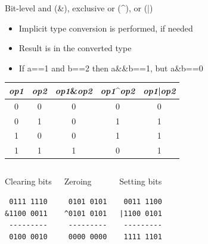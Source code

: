 \documentclass[usenames,dvipsnames,aspectratio=169]{beamer}
\begin{document}
\begin{frame}[fragile]{Bit-level and (\&), exclusive or (\textasciicircum), or (|)}
  \begin{itemize}
    \item Implicit type conversion is performed, if needed
    \item Result is in the converted type
    \item {} If a==1 and b==2 then a\&\&b==1, but a\&b==0
  \end{itemize}
  \begin{center}
    \footnotesize
    \begin{tabular}{ccccc}
    \emph{op1} & \emph{op2} & \emph{op1}\&\emph{op2} & \emph{op1}\textasciicircum\emph{op2} & \emph{op1}|\emph{op2}\\ \hline
    0 & 0 & 0 & 0 & 0\\
    0 & 1 & 0 & 1 & 1\\
    1 & 0 & 0 & 1 & 1\\
    1 & 1 & 1 & 0 & 1
    \end{tabular}
  \end{center}
  \normalsize
  \begin{columns}
      \begin{exampleblock}{Clearing bits}
        \begin{verbatim}
 0111 1110
&1100 0011
 ---------
 0100 0010
\end{verbatim}
      \end{exampleblock}
      \begin{exampleblock}{Zeroing}
        \begin{verbatim}
 0101 0101
^0101 0101
 ---------
 0000 0000
\end{verbatim}
      \end{exampleblock}
      \begin{exampleblock}{Setting bits}
        \begin{verbatim}
 0011 1100
|1100 0101
 ---------
 1111 1101
\end{verbatim}
      \end{exampleblock}
  \end{columns}
\end{frame}
\end{document}
